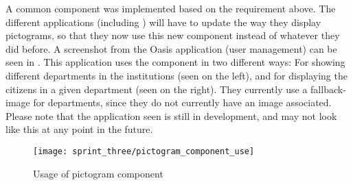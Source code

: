 A common component was implemented based on the requirement above. The different applications (including \ct) will have to update the way they display pictograms, so that they now use this new component instead of whatever they did before. A screenshot from the Oasis application (user management) can be seen in . This application uses the component in two different ways: For showing different departments in the institutions (seen on the left), and for displaying the citizens in a given department (seen on the right). They currently use a fallback-image for departments, since they do not currently have an image associated. Please note that the application seen is still in development, and may not look like this at any point in the future. 

\begin{figure}[!htbp]
	\centering
	\texttt{[image: sprint\_three/pictogram\_component\_use]}
	\caption{Usage of pictogram component}
	\label{fig:pictogram_component_use}
\end{figure}
